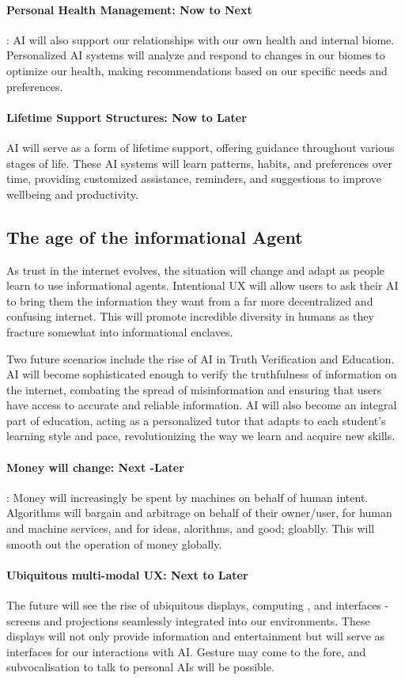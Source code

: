 \paragraph{Personal Health Management: Now to Next}: 
AI will also support our relationships with our own health and internal biome. Personalized AI systems will analyze and respond to changes in our biomes to optimize our health, making recommendations based on our specific needs and preferences.
\paragraph{Lifetime Support Structures: Now to Later}
AI will serve as a form of lifetime support, offering guidance throughout various stages of life. These AI systems will learn patterns, habits, and preferences over time, providing customized assistance, reminders, and suggestions to improve wellbeing and productivity.
\subsection{The age of the informational Agent}
As trust in the internet evolves, the situation will change and adapt as people learn to use informational agents. Intentional UX will allow users to ask their AI to bring them the information they want from a far more decentralized and confusing internet. This will promote incredible diversity in humans as they fracture somewhat into informational enclaves.

Two future scenarios include the rise of AI in Truth Verification and Education. AI will become sophisticated enough to verify the truthfulness of information on the internet, combating the spread of misinformation and ensuring that users have access to accurate and reliable information. AI will also become an integral part of education, acting as a personalized tutor that adapts to each student's learning style and pace, revolutionizing the way we learn and acquire new skills.

\paragraph{Money will change: Next -Later}: Money will increasingly be spent by machines on behalf of human intent. Algorithms will bargain and arbitrage on behalf of their owner/user, for human and machine services, and for ideas, alorithms, and good; gloablly. This will smooth out the operation of money globally.

\paragraph{Ubiquitous multi-modal UX: Next to Later}
The future will see the rise of ubiquitous displays, computing \cite{lyytinen2002ubiquitous}, and interfaces - screens and projections seamlessly integrated into our environments. These displays will not only provide information and entertainment but will serve as interfaces for our interactions with AI. Gesture may come to the fore, and subvocalisation to talk to personal AIs will be possible.


